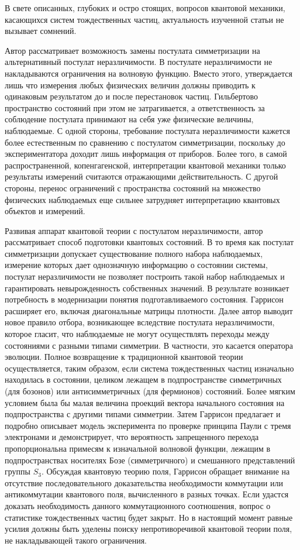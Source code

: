 \documentclass[a4paper, 12pt]{article}
\begin{document}
В свете описанных, глубоких и остро стоящих, вопросов квантовой 
механики, касающихся систем тождественных частиц, актуальность изученной 
статьи не вызывает сомнений.

Автор рассматривает возможность замены постулата симметризации на 
альтернативный постулат неразличимости. В постулате неразличимости не 
накладываются ограничения на волновую функцию. Вместо этого, 
утверждается лишь что измерения любых физических величин должны 
приводить к одинаковым результатом до и после перестановок частиц. 
Гильбертово пространство состояний при этом не затрагивается, 
а ответственность за соблюдение постулата принимают на себя уже 
физические величины, наблюдаемые.
%
С одной стороны, требование постулата неразличимости кажется более 
естественным по сравнению с постулатом симметризации, поскольку до 
экспериментатора доходит лишь информация от приборов. Более того, 
в самой распространенной, копенгагенской, интерпретации квантовой 
механики только результаты измерений считаются отражающими 
действительность. С другой стороны, перенос ограничений с пространства 
состояний на множество физических наблюдаемых еще сильнее затрудняет 
интерпретацию квантовых объектов и измерений.

Развивая аппарат квантовой теории с постулатом неразличимости, автор 
рассматривает способ подготовки квантовых состояний. В то время как 
постулат симметризации допускает существование полного набора 
наблюдаемых, измерение которых дает однозначную информацию о состоянии 
системы, постулат неразличимости не позволяет построить такой набор 
наблюдаемых и гарантировать невырожденность собственных значений. 
В результате возникает потребность в модернизации понятия 
подготавливаемого состояния. Гаррисон расширяет его, включая 
диагональные матрицы плотности.
%
Далее автор выводит новое правило отбора, возникающее вследствие 
постулата неразличимости, которое гласит, что наблюдаемые не могут 
осуществлять переходы между состояниями с разными типами симметрии. 
В частности, это касается оператора эволюции.
%
Полное возвращение к традиционной квантовой теории осуществляется, таким 
образом, если система тождественных частиц изначально находилась 
в состоянии, целиком лежащем в подпространстве симметричных (для 
бозонов) или антисимметричных (для фермионов) состояний. Более мягким 
условием была бы малая величина проекций вектора начального состояния на 
подпространства с другими типами симметрии.
%
Затем Гаррисон предлагает и подробно описывает модель эксперимента по 
проверке принципа Паули с тремя электронами и демонстрирует, что 
вероятность запрещенного перехода пропорциональна примесям к изначальной 
волновой функции, лежащим в подпространствах носителях Бозе 
(симметричного) и смешанного представлений группы $S_3$.
%
Обсуждая квантовую теорию поля, Гаррисон обращает внимание на отсутствие 
последовательного доказательства необходимости коммутации или 
антикоммутации квантового поля, вычисленного в разных точках. Если 
удастся доказать необходимость данного коммутационного соотношения, 
вопрос о статистике тождественных частиц будет закрыт. Но в настоящий 
момент равные усилия должны быть уделены поиску непротиворечивой 
квантовой теории поля, не накладывающей такого ограничения.
\end{document}
